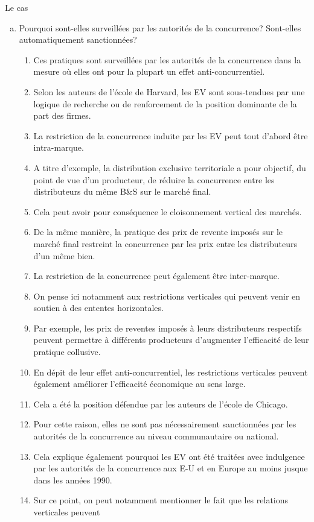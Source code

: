 \begin{frame}[allowframebreaks]{Le cas}
\begin{enumerate}[(a)]
\framebreak

\item Pourquoi sont-elles surveillées 
par les autorités de la concurrence? Sont-elles 
automatiquement sanctionnées?
\begin{enumerate}[$\star$]
\item Ces pratiques sont surveillées par les autorités de la concurrence dans 
la mesure où elles ont pour la plupart un effet anti-concurrentiel.
\item Selon les auteurs de l’école de Harvard, les EV sont sous-tendues par une logique de recherche 
ou de renforcement de la position dominante de la part des firmes.
\item La restriction de la concurrence induite par les EV peut tout d’abord être intra-marque.
\item A titre d’exemple, la distribution exclusive territoriale a pour objectif, 
du point de vue d’un producteur, de réduire 
la concurrence entre les distributeurs du même B\&S sur le marché final. 
\item Cela peut avoir pour conséquence le cloisonnement vertical des marchés. 
\item De la même manière, la pratique des prix de revente imposés sur le marché final 
restreint la concurrence par les prix entre les distributeurs d’un même bien.
\item La restriction de la concurrence peut également être inter-marque. 
\item On pense ici notamment aux restrictions verticales qui peuvent venir en soutien à 
des ententes horizontales. 
\item Par exemple, les prix de reventes imposés à leurs distributeurs respectifs
 peuvent permettre à différents producteurs d’augmenter l’efficacité de leur pratique collusive.
 \item En dépit de leur effet anti-concurrentiel, les restrictions verticales peuvent
  également améliorer l’efficacité économique au sens large. 
 \item Cela a été la position défendue par les auteurs de l’école de Chicago. 
 \item Pour cette raison, elles ne sont pas nécessairement sanctionnées par les autorités
  de la concurrence au niveau communautaire ou national. 
 \item Cela explique également pourquoi les EV ont été traitées avec indulgence par les 
 autorités de la concurrence aux
  E-U et en Europe au moins jusque dans les années 1990. 
 \item Sur ce point, on peut notamment mentionner le fait que les relations verticales peuvent 

\end{enumerate}
\end{enumerate}
\end{frame}
